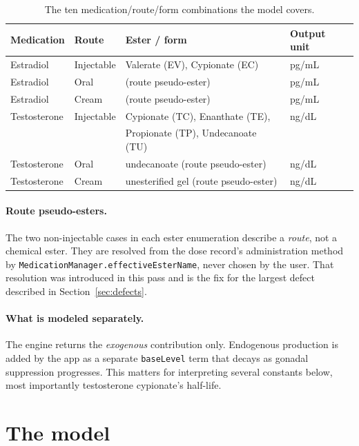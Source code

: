 \documentclass[11pt,a4paper]{article}
\newcommand{\code}[1]{\texttt{\small #1}}
\begin{document}
\begin{table}[h]
\centering
\small
\begin{tabular}{@{}llll@{}}
\toprule
\textbf{Medication} & \textbf{Route} & \textbf{Ester / form} & \textbf{Output unit} \\
\midrule
Estradiol     & Injectable   & Valerate (EV), Cypionate (EC) & pg/mL \\
Estradiol     & Oral         & (route pseudo-ester)          & pg/mL \\
Estradiol     & Cream        & (route pseudo-ester)          & pg/mL \\
Testosterone  & Injectable   & Cypionate (TC), Enanthate (TE), & ng/dL \\
              &              & Propionate (TP), Undecanoate (TU) & \\
Testosterone  & Oral         & undecanoate (route pseudo-ester) & ng/dL \\
Testosterone  & Cream        & unesterified gel (route pseudo-ester) & ng/dL \\
\bottomrule
\end{tabular}
\caption{The ten medication/route/form combinations the model covers.}
\end{table}

\paragraph{Route pseudo-esters.} The two non-injectable cases in each ester
enumeration describe a \emph{route}, not a chemical ester. They are resolved from
the dose record's administration method by
\code{MedicationManager.effectiveEsterName}, never chosen by the user. That
resolution was introduced in this pass and is the fix for the largest defect
described in Section~\ref{sec:defects}.

\paragraph{What is modeled separately.} The engine returns the \emph{exogenous}
contribution only. Endogenous production is added by the app as a separate
\code{baseLevel} term that decays as gonadal suppression progresses. This matters
for interpreting several constants below, most importantly testosterone
cypionate's half-life.

\section{The model}
\end{document}
